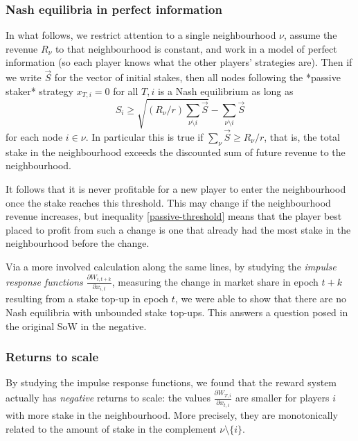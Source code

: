 \subsubsection*{Nash equilibria in perfect information}

In what follows, we restrict attention to a single neighbourhood $\nu$, assume the revenue $R_\nu$ to that neighbourhood is constant, and work in a model of perfect information (so each player knows what the other players' strategies are). Then if we write $\vec{S}$ for the vector of initial stakes, then all nodes following the *passive staker* strategy $x_{T,i}=0$ for all $T, i$ is a Nash equilibrium as long as
%
\begin{equation} \label{passive-threshold}
S_i \geq \sqrt{(R_\nu/r)\sum_{\nu\setminus i}\vec{S}} - \sum_{\nu\setminus i}\vec{S}
\end{equation}
%
for each node $i\in \nu$. In particular this is true if $\sum_{\nu}\vec{S}\geq R_\nu/r$, that is, the total stake in the neighbourhood exceeds the discounted sum of future revenue to the neighbourhood.

It follows that it is never profitable for a new player to enter the neighbourhood once the stake reaches this threshold. This may change if the neighbourhood revenue increases, but inequality \eqref{passive-threshold} means that the player best placed to profit from such a change is one that already had the most stake in the neighbourhood before the change.

Via a more involved calculation along the same lines, by studying the \emph{impulse response functions} $\frac{\partial W_{i,t+k}}{\partial x_{i,t}}$, measuring the change in market share in epoch $t+k$ resulting from a stake top-up in epoch $t$, 
%
we were able to show that there are no Nash equilibria with unbounded stake top-ups. This answers a question posed in the original SoW in the negative.

\subsubsection*{Returns to scale}

By studying the impulse response functions, we found that the reward system actually has \emph{negative} returns to scale: the values $\frac{\partial W_{T,i}}{\partial x_{t,i}}$ are smaller for players $i$ with more stake in the neighbourhood. More precisely, they are monotonically related to the amount of stake in the complement $\nu\setminus\{i\}$.

